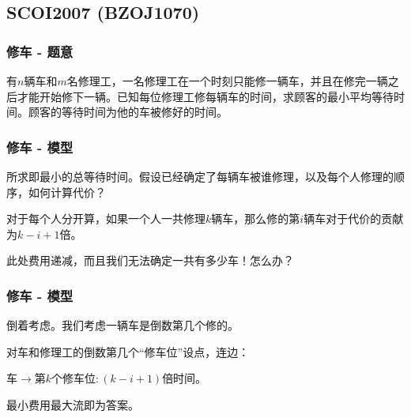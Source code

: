 \documentclass[9pt,dvipsnames,table]{beamer}
\begin{document}
\subsection{SCOI2007 (BZOJ1070)}
\begin{frame}
	\frametitle{修车 - 题意}
	有$n$辆车和$m$名修理工，一名修理工在一个时刻只能修一辆车，并且在修完一辆之后才能开始修下一辆。已知每位修理工修每辆车的时间，求顾客的最小平均等待时间。顾客的等待时间为他的车被修好的时间。
\end{frame}
\begin{frame}
	\frametitle{修车 - 模型}
	所求即最小的总等待时间。假设已经确定了每辆车被谁修理，以及每个人修理的顺序，如何计算代价？\pause
	
	对于每个人分开算，如果一个人一共修理$k$辆车，那么修的第$i$辆车对于代价的贡献为$k-i+1$倍。
	
	此处费用递减，而且我们无法确定一共有多少车！怎么办？
\end{frame}
\begin{frame}
	\frametitle{修车 - 模型}
	倒着考虑。我们考虑一辆车是倒数第几个修的。
	
	对车和修理工的倒数第几个``修车位''设点，连边：
	
	车$\rightarrow$第$k$个修车位$:(k-i+1)$倍时间。
	
	最小费用最大流即为答案。
\end{frame}
\end{document}
